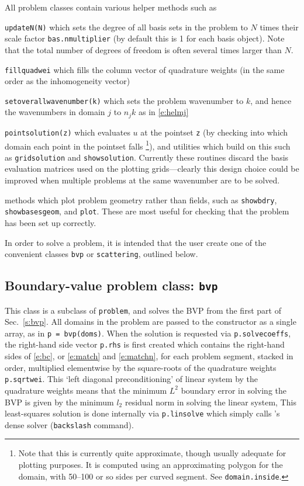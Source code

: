 \documentclass[12pt]{article}
\begin{document}
All problem classes contain various helper methods such as
\bi
\item
{\tt updateN(N)} which sets the degree of all basis sets in the
problem to $N$ times their scale factor {\tt bas.nmultiplier}
(by default this is 1 for each basis object).
Note that the total number of degrees of freedom is often several times
larger than $N$.
\item
{\tt fillquadwei} which fills the column vector of
quadrature weights (in the same order as the inhomogeneity vector)
\item {\tt setoverallwavenumber(k)} which sets the problem wavenumber to $k$,
and hence the wavenumbers in domain $j$ to $n_j k$ as in \eqref{e:helmj}
\item {\tt pointsolution(z)} which evaluates $u$ at the pointset {\tt z}
(by checking into which domain each point in the pointset falls%
  \footnote{Note that this is currently quite approximate, though usually
    adequate for plotting purposes. It is computed using an approximating
    polygon for the domain, with 50--100 or so sides per curved segment.
    See {\tt domain.inside}.}),
and utilities which build on this such as {\tt gridsolution} and
{\tt showsolution}. Currently these routines discard the
basis evaluation matrices used on the plotting grids---clearly 
this design choice could be improved when multiple problems at the
same wavenumber are to be solved.
\item methods which plot problem geometry rather than fields, such as
{\tt showbdry}, {\tt showbasesgeom}, and {\tt plot}.
These are most useful for checking that the problem has been set up correctly.
\ei

In order to solve a problem, it is intended that the user create one of the
convenient classes {\tt bvp} or {\tt scattering}, outlined below.


\subsection{Boundary-value problem class: {\tt bvp}}

This class is a subclass of {\tt problem}, and solves
the BVP from the first part of Sec.~\ref{s:bvp}.
All domains in the problem are passed to the constructor
as a single array, as in {\tt p = bvp(doms)}.
When the solution is requested via {\tt p.solvecoeffs}, 
the right-hand side vector {\tt p.rhs} is first created which
contains the right-hand sides of \eqref{e:bc}, or \eqref{e:match} and
\eqref{e:matchn}, for each problem segment, stacked in order,
multiplied elementwise
by the square-roots of the quadrature weights {\tt p.sqrtwei}.
This `left diagonal preconditioning' of linear system
by the quadrature weights means that
the minimum $L^2$ boundary error in solving the BVP is
given by the minimum $l_2$ residual norm in solving the linear system,
This least-squares solution is done internally via {\tt p.linsolve}
which simply calls \matlab's dense solver ({\tt backslash} command).
\end{document}

